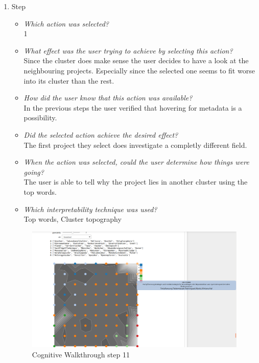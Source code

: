 {\begin{enumerate}
		\item Step
		\begin{itemize}
			\item \textit{Which action was selected?} \\
			1
			\item \textit{What effect was the user trying to achieve by selecting this action?} \\
			Since the cluster does make sense the user decides to have a look at the neighbouring projects. Especially since the selected one seems to fit worse into its cluster than the rest. 
			\item \textit{How did the user know that this action was available?} \\
			In the previous steps the user verified that hovering for metadata is a possibility. 
			\item \textit{Did the selected action achieve the desired effect?} \\
			The first project they select does investigate a completly different field. 
			\item \textit{When the action was selected, could the user determine how things were going?} \\
			The user is able to tell why the project lies in another cluster using the top words.
			\item \textit{Which interpretability technique was used?}\\
			Top words, Cluster topography
		\end{itemize}
		\begin{figure}[H]
			\centering
			\includegraphics[width=400px]{../chapters/validation/pics/9_c}
			\caption{\label{pic:step11} Cognitive Walkthrough step 11}
		\end{figure} \newpage
		

\end{enumerate}}
